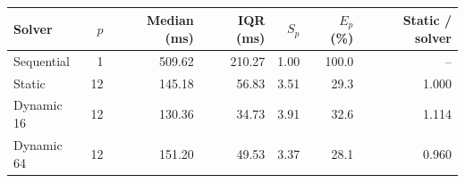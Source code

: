 \begin{tabular}{@{}lrrrrrr@{}}\toprule
Solver & $p$ & Median (ms) & IQR (ms) & $S_p$ & $E_p$ (\%) & Static / solver \\\midrule
Sequential & 1 & 509.62 & 210.27 & 1.00 & 100.0 & -- \\
Static & 12 & 145.18 & 56.83 & 3.51 & 29.3 & 1.000 \\
Dynamic 16 & 12 & 130.36 & 34.73 & 3.91 & 32.6 & 1.114 \\
Dynamic 64 & 12 & 151.20 & 49.53 & 3.37 & 28.1 & 0.960 \\
\bottomrule\end{tabular}
